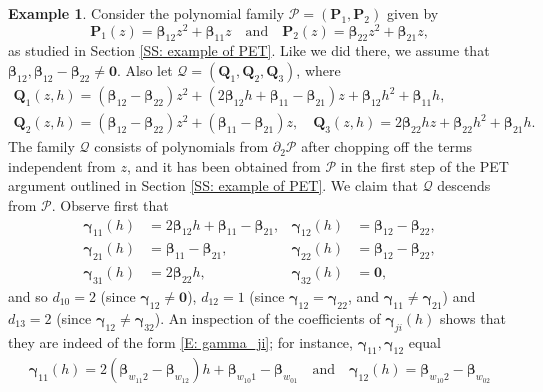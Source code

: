 \documentclass[11pt]{amsart}
\theoremstyle{definition}
\newtheorem{example}[lemma]{Example} %
\newcommand{\CP}{{\mathcal P}}
\newcommand{\CQ}{{\mathcal Q}}
\newcommand{\bp}{{\mathbf{P}}}
\newcommand{\bq}{{\mathbf{Q}}}
\newcommand{\bgamma}{{\boldsymbol{\gamma}}}
\newcommand{\bbeta}{{\boldsymbol{\beta}}}
\begin{document}
      {\begin{example}
      Consider the polynomial family $\CP = (\bp_1, \bp_2)$ given by $$\bp_1(z) =\bbeta_{12}z^2 + \bbeta_{11}z\quad \textrm{and}\quad \bp_2(z) = \bbeta_{22}z^2 + \bbeta_{21}z,$$ as studied in Section \ref{SS: example of PET}. Like we did there, we assume that $\bbeta_{12}, \bbeta_{12}-\bbeta_{22}\neq \mathbf{0}$. Also let $\CQ = (\bq_1, \bq_2, \bq_3)$, where
      \begin{gather*}
             \bq_1(z,h) = (\bbeta_{12}-\bbeta_{22})z^2 + (2\bbeta_{12}h+\bbeta_{11}-\bbeta_{21} )z + \bbeta_{12}h^2 + \bbeta_{11}h,\\ \bq_2(z,h) = (\bbeta_{12}-\bbeta_{22})z^2 + (\bbeta_{11}-\bbeta_{21})z,\quad \bq_3(z,h) = 2\bbeta_{22}hz + \bbeta_{22} h^2 + \bbeta_{21}h.
      \end{gather*}
      The family $\CQ$ consists of polynomials from $\partial_{2}\CP$ after chopping off the terms independent from $z$, and it has been obtained from $\CP$ in the first step of the PET argument outlined in Section \ref{SS: example of PET}. We claim that $\CQ$ descends from $\CP$. Observe first that
      \begin{align*}
          \bgamma_{11}(h) &= 2\bbeta_{12}h+\bbeta_{11}-\bbeta_{21}, & \bgamma_{12}(h) &= \bbeta_{12}-\bbeta_{22},\\
          \bgamma_{21}(h) &= \bbeta_{11}-\bbeta_{21}, & \bgamma_{22}(h) &= \bbeta_{12}-\bbeta_{22},\\
          \bgamma_{31}(h) &= 2\bbeta_{22}h, & \bgamma_{32}(h) &= \textbf{0},
      \end{align*}
      and so $d_{10} = 2$ (since $\bgamma_{12}\neq \mathbf{0}$), $d_{12} = 1$ (since $\bgamma_{12} = \bgamma_{22}$, and $\bgamma_{11}\neq \bgamma_{21}$) and $d_{13} = 2$ (since $\bgamma_{12}\neq \bgamma_{32}$).
    An inspection of the coefficients of $\bgamma_{ji}(h)$ shows that they are indeed of the form \eqref{E: gamma_ji}; for instance, $\bgamma_{11}, \bgamma_{12}$ equal
    \begin{align*}
        \bgamma_{11}(h) = 2(\bbeta_{w_{11}2}-\bbeta_{w_12})h+\bbeta_{w_{10}1}-\bbeta_{w_01}\quad\textrm{and}\quad \bgamma_{12}(h) = \bbeta_{w_{10}2}-\bbeta_{w_02}

\end{align*}
\end{example}}
\end{document}
